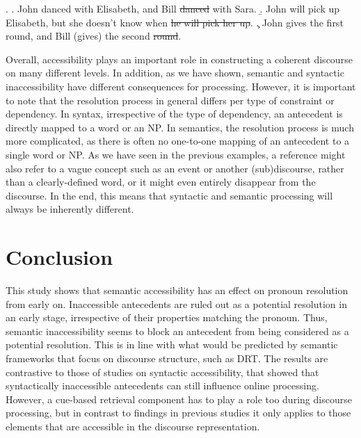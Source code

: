\documentclass[11pt]{article} %
\begin{document}
\ex.
\a. John danced with Elisabeth, and Bill \sout{danced} with Sara. 
\b. John will pick up Elisabeth, but she doesn't know when \sout{he will pick her up}.
\c. John gives the first round, and Bill (gives) the second \sout{round}.

Overall, accessibility plays an important role in constructing a coherent discourse on many different levels. In addition, as we have shown, semantic and syntactic inaccessibility have different consequences for processing. However, it is important to note that the resolution process in general differs per type of constraint or dependency.  In syntax, irrespective of the type of dependency, an antecedent is directly mapped to a word or an NP. In semantics, the resolution process is much more complicated, as there is often no one-to-one mapping of an antecedent to a single word or NP. As we have seen in the previous examples, a reference might also refer to a vague concept such as an event or another (sub)discourse, rather than a clearly-defined word, or it might even entirely disappear from the discourse. In the end, this means that syntactic and semantic processing will always be inherently different.


\section{Conclusion}
This study shows that semantic accessibility has an effect on pronoun resolution from early on. Inaccessible antecedents are ruled out as a potential resolution in an early stage, irrespective of their properties matching the pronoun. Thus, semantic inaccessibility seems to block an antecedent from being considered as a potential resolution. This is in line with what would be predicted by semantic frameworks that focus on discourse structure, such as DRT. The results are contrastive to those of studies on syntactic accessibility, that showed that syntactically inaccessible antecedents can still influence online processing. However, a cue-based retrieval component has to play a role too during discourse processing, but in contrast to findings in previous studies it only applies to those elements that are accessible in the discourse representation.
\end{document}
